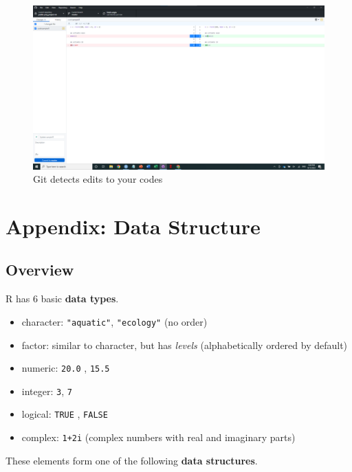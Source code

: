 \documentclass[
]{book}
\providecommand{\tightlist}{%
  \setlength{\itemsep}{0pt}\setlength{\parskip}{0pt}}
\begin{document}
\begin{figure}

{\centering \includegraphics[width=61.11in]{image/git_image06} 

}

\caption{Git detects edits to your codes}\label{fig:gitdesktop5}
\end{figure}

\hypertarget{appendix-data-structure}{%
\chapter{Appendix: Data Structure}\label{appendix-data-structure}}

\hypertarget{overview}{%
\section{Overview}\label{overview}}

R has 6 basic \textbf{data types}.

\begin{itemize}
\tightlist
\item
  character: \texttt{"aquatic"}, \texttt{"ecology"} (no order)
\item
  factor: similar to character, but has \emph{levels} (alphabetically ordered by default)
\item
  numeric: \texttt{20.0} , \texttt{15.5}
\item
  integer: \texttt{3}, \texttt{7}
\item
  logical: \texttt{TRUE} , \texttt{FALSE}
\item
  complex: \texttt{1+2i} (complex numbers with real and imaginary parts)
\end{itemize}

These elements form one of the following \textbf{data structures}.
\end{document}
